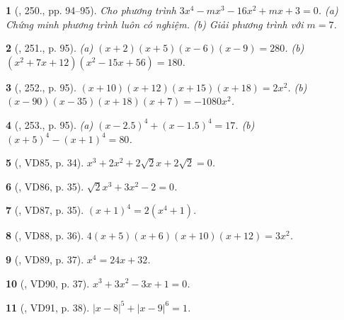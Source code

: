 \documentclass{article}
\newtheorem{baitoan}{}
\begin{document}
\begin{baitoan}[\cite{Tuyen_Toan_9_old}, 250., pp. 94--95]
	Cho phương trình $3x^4 - mx^3 - 16x^2 + mx + 3 = 0$. (a) Chứng minh phương trình luôn có nghiệm. (b) Giải phương trình với $m = 7$.
\end{baitoan}

\begin{baitoan}[\cite{Tuyen_Toan_9_old}, 251., p. 95]
	(a) $(x + 2)(x + 5)(x - 6)(x - 9) = 280$. (b) $(x^2 + 7x + 12)(x^2 - 15x + 56) = 180$.
\end{baitoan}

\begin{baitoan}[\cite{Tuyen_Toan_9_old}, 252., p. 95]
	$(x + 10)(x + 12)(x + 15)(x + 18) = 2x^2$. (b) $(x - 90)(x - 35)(x + 18)(x + 7) = -1080x^2$.
\end{baitoan}

\begin{baitoan}[\cite{Tuyen_Toan_9_old}, 253., p. 95]
	(a) $(x - 2.5)^4 + (x - 1.5)^4 = 17$. (b) $(x + 5)^4 - (x + 1)^4 = 80$.
\end{baitoan}

\begin{baitoan}[\cite{Binh_Toan_9_tap_2}, VD85, p. 34]
	$x^3 + 2x^2 + 2\sqrt{2}x + 2\sqrt{2} = 0$.
\end{baitoan}

\begin{baitoan}[\cite{Binh_Toan_9_tap_2}, VD86, p. 35]
	$\sqrt{2}x^3 + 3x^2 - 2 = 0$.
\end{baitoan}

\begin{baitoan}[\cite{Binh_Toan_9_tap_2}, VD87, p. 35]
	$(x + 1)^4 = 2(x^4 + 1)$.
\end{baitoan}

\begin{baitoan}[\cite{Binh_Toan_9_tap_2}, VD88, p. 36]
	$4(x + 5)(x + 6)(x + 10)(x + 12) = 3x^2$.
\end{baitoan}

\begin{baitoan}[\cite{Binh_Toan_9_tap_2}, VD89, p. 37]
	$x^4 = 24x + 32$.
\end{baitoan}

\begin{baitoan}[\cite{Binh_Toan_9_tap_2}, VD90, p. 37]
	$x^3 + 3x^2 - 3x + 1 = 0$.
\end{baitoan}

\begin{baitoan}[\cite{Binh_Toan_9_tap_2}, VD91, p. 38]
	$|x - 8|^5 + |x - 9|^6 = 1$.
\end{baitoan}
\end{document}
